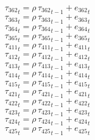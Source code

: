 \begin{dmath}
{{\tau_{362}}}_{t}={{\rho}}\, {{\tau_{362}}}_{t-1}+{{e_{362}}}_{t}
\end{dmath}
\begin{dmath}
{{\tau_{363}}}_{t}={{\rho}}\, {{\tau_{363}}}_{t-1}+{{e_{363}}}_{t}
\end{dmath}
\begin{dmath}
{{\tau_{364}}}_{t}={{\rho}}\, {{\tau_{364}}}_{t-1}+{{e_{364}}}_{t}
\end{dmath}
\begin{dmath}
{{\tau_{365}}}_{t}={{\rho}}\, {{\tau_{365}}}_{t-1}+{{e_{365}}}_{t}
\end{dmath}
\begin{dmath}
{{\tau_{411}}}_{t}={{\rho}}\, {{\tau_{411}}}_{t-1}+{{e_{411}}}_{t}
\end{dmath}
\begin{dmath}
{{\tau_{412}}}_{t}={{\rho}}\, {{\tau_{412}}}_{t-1}+{{e_{412}}}_{t}
\end{dmath}
\begin{dmath}
{{\tau_{413}}}_{t}={{\rho}}\, {{\tau_{413}}}_{t-1}+{{e_{413}}}_{t}
\end{dmath}
\begin{dmath}
{{\tau_{414}}}_{t}={{\rho}}\, {{\tau_{414}}}_{t-1}+{{e_{414}}}_{t}
\end{dmath}
\begin{dmath}
{{\tau_{415}}}_{t}={{\rho}}\, {{\tau_{415}}}_{t-1}+{{e_{415}}}_{t}
\end{dmath}
\begin{dmath}
{{\tau_{421}}}_{t}={{\rho}}\, {{\tau_{421}}}_{t-1}+{{e_{421}}}_{t}
\end{dmath}
\begin{dmath}
{{\tau_{422}}}_{t}={{\rho}}\, {{\tau_{422}}}_{t-1}+{{e_{422}}}_{t}
\end{dmath}
\begin{dmath}
{{\tau_{423}}}_{t}={{\rho}}\, {{\tau_{423}}}_{t-1}+{{e_{423}}}_{t}
\end{dmath}
\begin{dmath}
{{\tau_{424}}}_{t}={{\rho}}\, {{\tau_{424}}}_{t-1}+{{e_{424}}}_{t}
\end{dmath}
\begin{dmath}
{{\tau_{425}}}_{t}={{\rho}}\, {{\tau_{425}}}_{t-1}+{{e_{425}}}_{t}
\end{dmath}
